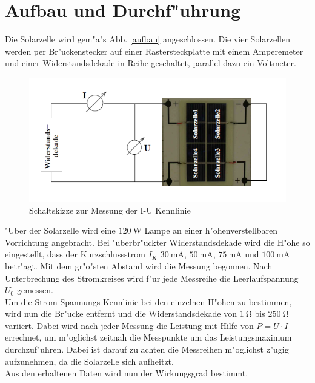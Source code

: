 \section{Aufbau und Durchf"uhrung}
	\label{sec:durchfuehrung}

	Die Solarzelle wird gem"a"s Abb. \eqref{aufbau} angeschlossen.
	Die vier Solarzellen werden per Br"uckenstecker auf einer Rastersteckplatte mit einem  Amperemeter und einer Widerstandsdekade in Reihe geschaltet, parallel dazu ein Voltmeter.

	\begin{figure}[htbp]
		\centering
		\includegraphics[width = 12cm]{img/aufbau.PNG}
		\caption{Schaltskizze zur Messung der I-U Kennlinie \cite{anleitung}}
		\label{aufbau}
	\end{figure}

	"Uber der Solarzelle wird eine $\SI{120}{\watt}$ Lampe an einer h"ohenverstellbaren Vorrichtung angebracht.
	Bei "uberbr"uckter Widerstandsdekade wird die H"ohe so eingestellt, dass der Kurzschlussstrom $I_K$ $\SI{30}{\milli\ampere}$, $\SI{50}{\milli\ampere}$, $\SI{75}{\milli\ampere}$ und $\SI{100}{\milli\ampere}$ betr"agt.
	Mit dem gr"o"sten Abstand wird die Messung begonnen.
	Nach Unterbrechung des Stromkreises wird f"ur jede Messreihe die Leerlaufspannung $U_0$ gemessen.\\
	Um die Strom-Spannungs-Kennlinie bei den einzelnen H"ohen zu bestimmen, wird nun die Br"ucke entfernt und die Widerstandsdekade von $\SI{1}{\ohm}$ bis $\SI{250}{\ohm}$ variiert.
	Dabei wird nach jeder Messung die Leistung mit Hilfe von $P = U \cdot I$ errechnet, um m"oglichst zeitnah die Messpunkte um das Leistungsmaximum durchzuf"uhren.
	Dabei ist darauf zu achten die Messreihen m"oglichst z"ugig aufzunehmen, da die Solarzelle sich aufheitzt.\\
	Aus den erhaltenen Daten wird nun der Wirkungsgrad bestimmt.